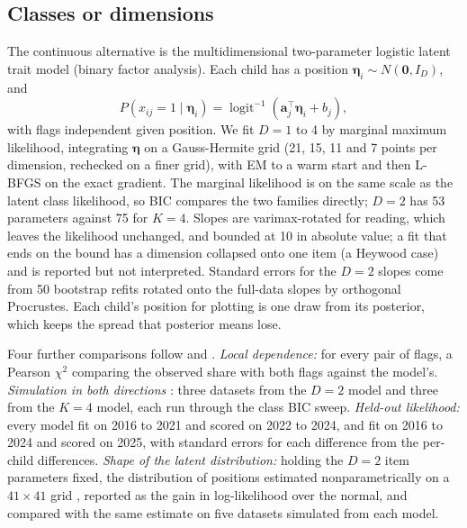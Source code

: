 \subsection{Classes or dimensions}
\label{sec:dimensions}
The continuous alternative is the multidimensional two-parameter logistic latent trait model (binary factor analysis). Each child has a position $\boldsymbol{\eta}_i\sim N(\mathbf{0},I_D)$, and
\[
P(x_{ij}=1\mid\boldsymbol{\eta}_i)=\operatorname{logit}^{-1}\!\left(\mathbf{a}_j^{\top}\boldsymbol{\eta}_i+b_j\right),
\]
with flags independent given position. We fit $D=1$ to 4 by marginal maximum likelihood, integrating $\boldsymbol{\eta}$ on a Gauss-Hermite grid (21, 15, 11 and 7 points per dimension, rechecked on a finer grid), with EM to a warm start and then L-BFGS on the exact gradient. The marginal likelihood is on the same scale as the latent class likelihood, so BIC compares the two families directly; $D=2$ has 53 parameters against 75 for $K=4$. Slopes are varimax-rotated for reading, which leaves the likelihood unchanged, and bounded at 10 in absolute value; a fit that ends on the bound has a dimension collapsed onto one item (a Heywood case) and is reported but not interpreted. Standard errors for the $D=2$ slopes come from 50 bootstrap refits rotated onto the full-data slopes by orthogonal Procrustes. Each child's position for plotting is one draw from its posterior, which keeps the spread that posterior means lose.

Four further comparisons follow \citet{lubke2006} and \citet{markon2006}. \emph{Local dependence:} for every pair of flags, a Pearson $\chi^2$ comparing the observed share with both flags against the model's. \emph{Simulation in both directions} \citep{bauer2004}: three datasets from the $D=2$ model and three from the $K=4$ model, each run through the class BIC sweep. \emph{Held-out likelihood:} every model fit on 2016 to 2021 and scored on 2022 to 2024, and fit on 2016 to 2024 and scored on 2025, with standard errors for each difference from the per-child differences. \emph{Shape of the latent distribution:} holding the $D=2$ item parameters fixed, the distribution of positions estimated nonparametrically on a $41\times41$ grid \citep{laird1978}, reported as the gain in log-likelihood over the normal, and compared with the same estimate on five datasets simulated from each model.

